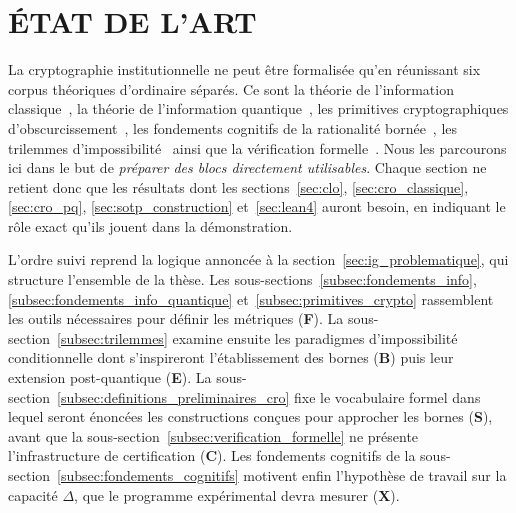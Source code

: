 
\section{\'ETAT DE L'ART}
\label{sec:etat_art}
\begin{sloppypar}
La cryptographie institutionnelle ne peut \^etre formalis\'ee qu'en r\'eunissant six corpus th\'eoriques d'ordinaire s\'epar\'es. Ce sont la th\'eorie de l'information classique~\cite{Shannon48,Shannon49,CoverThomas06}, la th\'eorie de l'information
quantique~\cite{NielsenChuang2010,Wilde2017}, les primitives cryptographiques d'obscurcissement~\cite{Pedersen91,Groth16}, les
fondements cognitifs de la rationalit\'e born\'ee~\cite{Simon82,Miller56}, les trilemmes d'impossibilit\'e~\cite{Arrow50,Brewer00,FLP85} ainsi que la v\'erification formelle~\cite{moura2015lean,Lean4,Coq,Isabelle}. Nous les parcourons ici dans le but de \emph{pr\'eparer des blocs directement utilisables}. Chaque section ne retient donc que les r\'esultats dont les sections~\ref{sec:clo}, \ref{sec:cro_classique},
\ref{sec:cro_pq}, \ref{sec:sotp_construction} et~\ref{sec:lean4}
auront besoin, en indiquant le r\^ole exact qu'ils jouent dans la d\'emonstration.

L'ordre suivi reprend la logique annonc\'ee \`a la section~\ref{sec:ig_problematique}, qui structure l'ensemble de la th\`ese. Les
sous-sections~\ref{subsec:fondements_info}, \ref{subsec:fondements_info_quantique}
et~\ref{subsec:primitives_crypto} rassemblent les outils n\'ecessaires pour
d\'efinir les m\'etriques (\textbf{F}). La sous-section~\ref{subsec:trilemmes}
examine ensuite les paradigmes d'impossibilit\'e conditionnelle dont s'inspireront
l'\'etablissement des bornes (\textbf{B}) puis leur extension
post-quantique (\textbf{E}). La sous-section~\ref{subsec:definitions_preliminaires_cro} fixe le
vocabulaire formel dans lequel seront \'enonc\'ees les constructions con\c{c}ues
pour approcher les bornes (\textbf{S}), avant que la sous-section~\ref{subsec:verification_formelle}
ne pr\'esente l'infrastructure de certification (\textbf{C}). Les fondements
cognitifs de la sous-section~\ref{subsec:fondements_cognitifs} motivent enfin
l'hypoth\`ese de travail sur la capacit\'e $\Delta$, que le programme
exp\'erimental devra mesurer (\textbf{X}).


\end{sloppypar}
